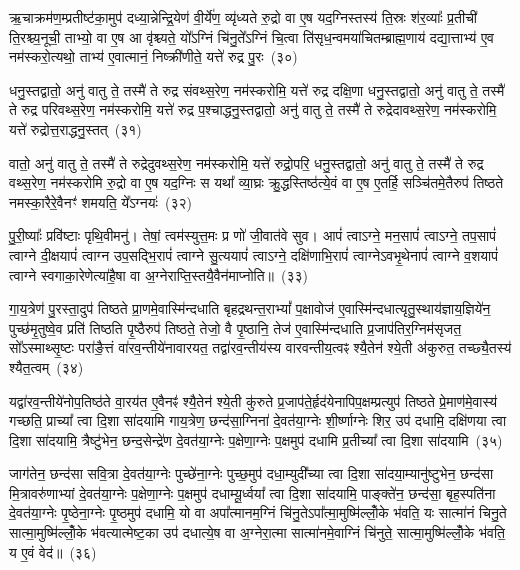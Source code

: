 ऋ॒चाक्रम॑ण॒म्प्रतीष्ट॑का॒मुप॑ दध्या॒न्नेन्द्रि॒येण॑ वी॒र्ये॑ण॒ व्यृ॑ध्यते रु॒द्रो वा ए॒ष यद॒ग्निस्तस्य॑ ति॒स्रः श॑र॒व्याः᳚ प्र॒तीची॑ ति॒रश्च्य॒नूची॒ ताभ्यो॒ वा ए॒ष आ वृ॑श्च्यते॒ यो᳚\-ऽग्निं चि॑नु॒ते᳚\-ऽग्निं चि॒त्वा ति॑सृध॒न्वमया॑चितम्ब्राह्म॒णाय॑ दद्या॒त्ताभ्य॑ ए॒व नम॑स्करो॒त्यथो॒ ताभ्य॑ ए॒वात्मानं॒ निष्क्री॑णीते॒ यत्ते॑ रुद्र पु॒रः~(३०)

धनु॒स्तद्वातो॒ अनु॑ वातु ते॒ तस्मै॑ ते रुद्र संवथ्स॒रेण॒ नम॑स्करोमि॒ यत्ते॑ रुद्र दक्षि॒णा धनु॒स्तद्वातो॒ अनु॑ वातु ते॒ तस्मै॑ ते रुद्र परिवथ्स॒रेण॒ नम॑स्करोमि॒ यत्ते॑ रुद्र प॒श्चाद्धनु॒स्तद्वातो॒ अनु॑ वातु ते॒ तस्मै॑ ते रुद्रेदावथ्स॒रेण॒ नम॑स्करोमि॒ यत्ते॑ रुद्रोत्त॒राद्धनु॒स्तत्~(३१)

वातो॒ अनु॑ वातु ते॒ तस्मै॑ ते रुद्रेदुवथ्स॒रेण॒ नम॑स्करोमि॒ यत्ते॑ रुद्रो॒परि॒ धनु॒स्तद्वातो॒ अनु॑ वातु ते॒ तस्मै॑ ते रुद्र वथ्स॒रेण॒ नम॑स्करोमि रु॒द्रो वा ए॒ष यद॒ग्निः स यथा᳚ व्या॒घ्रः क्रु॒द्धस्तिष्ठ॑त्ये॒वं वा ए॒ष ए॒तर्\mbox{}हि॒ सञ्चि॑तमे॒तैरुप॑ तिष्ठते नमस्का॒रैरे॒वैनꣳ॑ शमयति॒ ये᳚\-ऽग्नयः॑~(३२)

पु॒री॒ष्याः᳚ प्रवि॑ष्टाः पृथि॒वीमनु॑। तेषां॒ त्वम॑स्युत्त॒मः प्र णो॑ जी॒वात॑वे सुव। आपं॑ त्वाऽग्ने॒ मन॒सापं॑ त्वाऽग्ने॒ तप॒सापं॑ त्वाग्ने दी॒क्षयापं॑ त्वाग्न उप॒सद्भि॒रापं॑ त्वाग्ने सु॒त्ययापं॑ त्वाऽग्ने॒ दक्षि॑णाभि॒रापं॑ त्वाग्ने\-ऽवभृ॒थेनापं॑ त्वाग्ने व॒शयापं॑ त्वाग्ने स्वगाका॒रेणेत्या॑है॒षा वा अ॒ग्नेराप्ति॒स्तयै॒वैन॑माप्नोति॥~(३३)

{\anuvakamend[{ऐ॒न्द्रि॒या पु॒र उ॑त्त॒राद्धनु॒स्तद॒ग्नय॑ आहा॒ष्टौ च॑}]}%

गा॒य॒त्रेण॑ पु॒रस्ता॒दुप॑ तिष्ठते प्रा॒णमे॒वास्मि॑न्दधाति बृहद्रथन्त॒रा\-भ्यां᳚ प॒क्षावोज॑ ए॒वास्मि॑न्दधात्यृतु॒स्थाय॑ज्ञाय॒ज्ञिये॑न॒ पुच्छ॑मृ॒तुष्वे॒व प्रति॑ तिष्ठति पृ॒ष्ठैरुप॑ तिष्ठते॒ तेजो॒ वै पृ॒ष्ठानि॒ तेज॑ ए॒वास्मि॑न्दधाति प्र॒जाप॑तिर॒ग्निम॑सृजत॒ सो᳚\-ऽस्माथ्सृ॒ष्टः परा॑ङै॒त्तं वा॑रव॒न्तीये॑नावारयत॒ तद्वा॑रव॒न्तीय॑स्य वारवन्तीय॒त्वꣴ श्यै॒तेन॑ श्ये॒ती अ॑कुरुत॒ तच्छ्यै॒तस्य॑ श्यैत॒त्वम्~(३४)

यद्वा॑रव॒न्तीये॑नोप॒तिष्ठ॑ते वा॒रय॑त ए॒वैनꣴ॑ श्यै॒तेन॑ श्ये॒ती कु॑रुते प्र॒जाप॑ते॒र्\mbox{}हृद॑येनापिप॒क्षम्प्रत्युप॑ तिष्ठते प्रे॒माण॑मे॒वास्य॑ गच्छति॒ प्राच्या᳚ त्वा दि॒शा सा॑दयामि गाय॒त्रेण॒ छन्द॑सा॒ग्निना॑ दे॒वत॑या॒ग्नेः शी॒र्ष्णाग्नेः शिर॒ उप॑ दधामि॒ दक्षि॑णया त्वा दि॒शा सा॑दयामि॒ त्रैष्टु॑भेन॒ छन्द॒सेन्द्रे॑ण दे॒वत॑या॒ग्नेः प॒क्षेणा॒ग्नेः प॒क्षमुप॑ दधामि प्र॒तीच्या᳚ त्वा दि॒शा सा॑दयामि~(३५)

जाग॑तेन॒ छन्द॑सा सवि॒त्रा दे॒वत॑या॒ग्नेः पुच्छे॑ना॒ग्नेः पुच्छ॒मुप॑ दधा॒म्युदी᳚च्या त्वा दि॒शा सा॑दया॒म्यानु॑ष्टुभेन॒ छन्द॑सा मि॒त्रावरु॑णाभ्यां दे॒वत॑या॒ग्नेः प॒क्षेणा॒ग्नेः प॒क्षमुप॑ दधाम्यू॒र्ध्वया᳚ त्वा दि॒शा सा॑दयामि॒ पाङ्क्ते॑न॒ छन्द॑सा॒ बृह॒स्पति॑ना दे॒वत॑या॒ग्नेः पृ॒ष्ठेना॒ग्नेः पृ॒ष्ठमुप॑ दधामि॒ यो वा अपा᳚त्मानम॒ग्निं चि॑नु॒ते\-ऽपा᳚त्मा॒मुष्मि॑ल्लोँ॒के भ॑वति॒ यः सात्मा॑नं चिनु॒ते सात्मा॒मुष्मि॑ल्लोँ॒के भ॑वत्यात्मेष्ट॒का उप॑ दधात्ये॒ष वा अ॒ग्नेरा॒त्मा सात्मा॑नमे॒वाग्निं चि॑नुते॒ सात्मा॒मुष्मि॑ल्लोँ॒के भ॑वति॒ य ए॒वं वेद॑॥~(३६)

